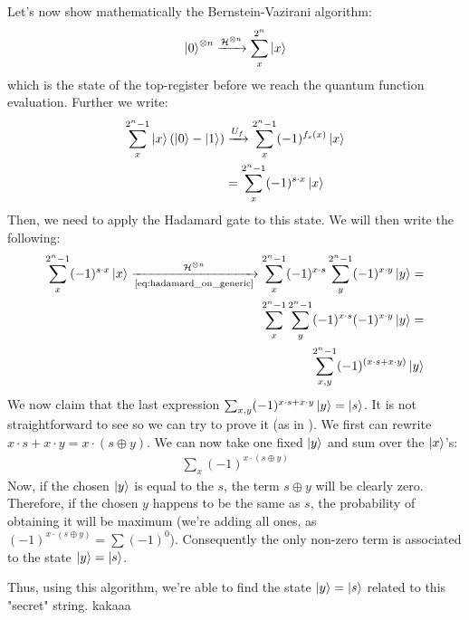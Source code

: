 Let's now show mathematically the Bernstein-Vazirani algorithm:
\begin{align}
  \ket{0}^{\otimes n} \xrightarrow{\mathcal{H}^{\otimes n}} \sum_x^{2^n} \ket{x}
\end{align}
which is the state of the top-register before we reach the quantum function evaluation. Further we write:
\begin{align}
  \sum_x^{2^n-1} \ket{x}(\ket{0}-\ket{1}) &\xrightarrow{U_f} \sum_x^{2^n-1} (-1)^{f_s(x)}\ket{x} \\ 
                                        &=\sum_x^{2^n-1} (-1)^{s\cdot x} \ket{x} 
\end{align}
Then, we need to apply the Hadamard gate to this state. We will then write the following:
\begin{align}
  \sum_x^{2^n-1} (-1)^{s\cdot x} \ket{x} \xrightarrow[\text{\autoref{eq:hadamard_on_generic}}]{\mathcal{H}^{\otimes n}} \sum_x^{2^n-1} (-1)^{x\cdot s} 
  \sum_y^{2^n-1} (-1)^{x \cdot y} \ket{y} =\\
\sum_x^{2^n-1} \sum_y^{2^n-1} (-1)^{x\cdot s} (-1)^{x \cdot y} \ket{y} =\\
\sum_{x,y}^{2^n-1} (-1)^{(x\cdot s + x\cdot y)} \ket{y}
\end{align}
We now claim that the last expression $\sum_{x,y} (-1)^{x\cdot s + x\cdot y}\ket{y} = \ket{s}$. It is not straightforward to see so we can try to prove it (as
in \cite{noauthor_bernsteinvazirani_2022}).
We first can rewrite $x\cdot s + x\cdot y=x\cdot (s\oplus y)$. 
We can now take one fixed $\ket{y}$ and sum over the $\ket{x}$'s:
\begin{align}
  \sum_{x} (-1)^{x \cdot (s \oplus y)}
\end{align}
Now, if the chosen $\ket{y}$ is equal to the $s$, the term $s\oplus y$ will be clearly zero. Therefore, if the chosen $y$ 
happens to be the same as $s$, the probability of obtaining it will be maximum (we're adding all ones, as $(-1)^{x\cdot(s\oplus y)} = \sum (-1)^{0}$).
Consequently the only non-zero term is associated to the state $\ket{y}=\ket{s}$.

Thus, using this algorithm, we're able to find the state $\ket{y}=\ket{s}$ related to this "secret" string.
 kakaaa
